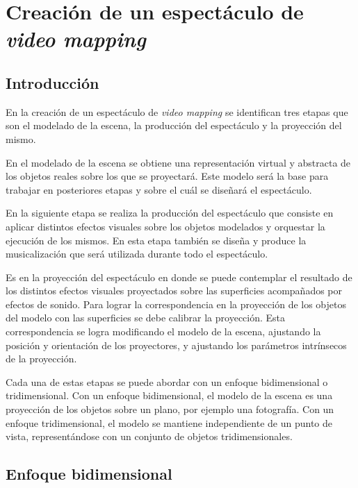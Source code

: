 \chapter{Creación de un espectáculo de \emph{video mapping}}

\section{Introducción}
En la creación de un espectáculo de \emph{video mapping} se identifican tres etapas que son el modelado de la escena, la producción del espectáculo y la proyección del mismo.

En el modelado de la escena se obtiene una representación virtual y abstracta de los objetos reales sobre los que se proyectará. Este modelo será la base para trabajar en posteriores etapas y sobre el cuál se diseñará el espectáculo.

En la siguiente etapa se realiza la producción del espectáculo que consiste en aplicar distintos efectos visuales sobre los objetos modelados y orquestar la ejecución de los mismos. En esta etapa también se diseña y produce la musicalización que será utilizada durante todo el espectáculo.

Es en la proyección del espectáculo en donde se puede contemplar el resultado de los distintos efectos visuales proyectados sobre las superficies acompañados por efectos de sonido.
Para lograr la correspondencia en la proyección de los objetos del modelo con las superficies se debe calibrar la proyección. Esta correspondencia se logra modificando el modelo de la escena, ajustando la posición y orientación de los proyectores, y ajustando los parámetros intrínsecos de la proyección.

Cada una de estas etapas se puede abordar con un enfoque bidimensional o tridimensional.
Con un enfoque bidimensional, el modelo de la escena es una proyección de los objetos sobre un plano, por ejemplo una fotografía. Con un enfoque tridimensional, el modelo se mantiene independiente de un punto de vista, representándose con un conjunto de objetos tridimensionales.


\section{Enfoque bidimensional}
